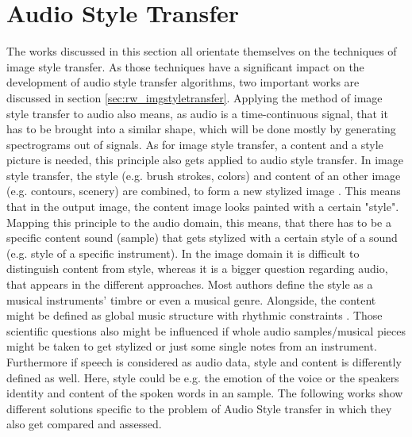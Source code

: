 \section{Audio Style Transfer}
\label{sec:rw_audio_style_transfer}
The works discussed in this section all orientate themselves on the techniques of image style transfer. As those techniques have a significant impact on the development of audio style transfer algorithms, two important works are discussed in section \ref{sec:rw_imgstyletransfer}. Applying the method of image style transfer to audio also means, as audio is a time-continuous signal, that it has to be brought into a similar shape, which will be done mostly by generating spectrograms out of signals. As for image style transfer, a content and a style picture is needed, this principle also gets applied to audio style transfer. In image style transfer, the style (e.g. brush strokes, colors) and content of an other image (e.g. contours, scenery) are combined, to form a new stylized image \cite{Gatys2016}. This means that in the output image, the content image looks painted with a certain "style". Mapping this principle to the audio domain, this means, that there has to be a specific content sound (sample) that gets stylized with a certain style of a sound (e.g. style of a specific instrument). In the image domain it is difficult to distinguish content from style, whereas it is a bigger question regarding audio, that appears in the different approaches. Most authors define the style as a musical instruments' timbre or even a musical genre. Alongside, the content might be defined as global music structure with rhythmic constraints \cite{Grinstein2018}. Those scientific questions also might be influenced if whole audio samples/musical pieces might be taken to get stylized or just some single notes from an instrument. Furthermore if speech is considered as audio data, style and content is differently defined as well. Here, style could be e.g. the emotion of the voice or the speakers identity and content of the spoken words in an sample. The following works show different solutions specific to the problem of Audio Style transfer in which they also get compared and assessed.


